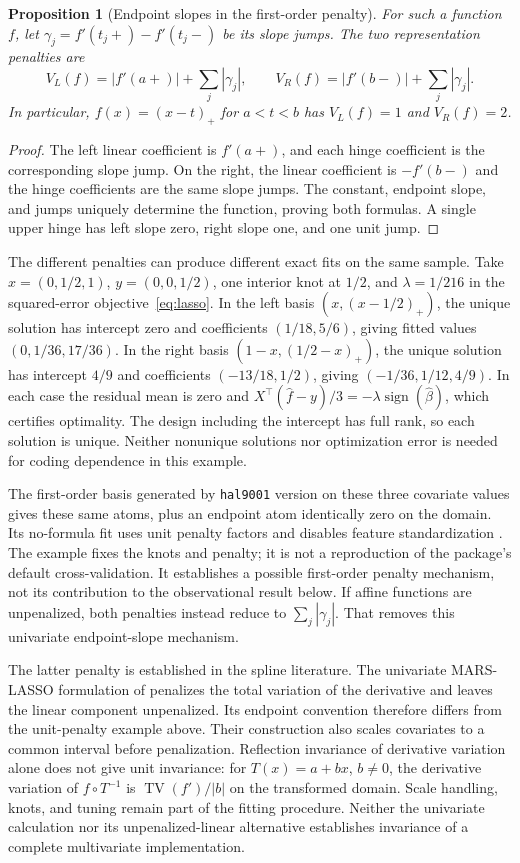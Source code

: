 \documentclass[11pt]{article}
\newtheorem{proposition}{Proposition}
\theoremstyle{definition}
\theoremstyle{remark}
\begin{document}
\begin{proposition}[Endpoint slopes in the first-order penalty]
\label{prop:firstorder-penalty}
For such a function $f$, let
$\gamma_j=f'(t_j+)-f'(t_j-)$ be its slope jumps. The two representation
penalties are
\[
 V_L(f)=|f'(a+)|+\sum_j|\gamma_j|,\qquad
 V_R(f)=|f'(b-)|+\sum_j|\gamma_j|.
\]
In particular, $f(x)=(x-t)_+$ for $a<t<b$ has $V_L(f)=1$ and $V_R(f)=2$.
\end{proposition}
\begin{proof}
The left linear coefficient is $f'(a+)$, and each hinge coefficient is
the corresponding slope jump. On the right, the linear coefficient is
$-f'(b-)$ and the hinge coefficients are the same slope jumps. The constant,
endpoint slope, and jumps uniquely determine the function, proving both
formulas. A single upper hinge has left slope zero, right slope one, and
one unit jump.
\end{proof}

The different penalties can produce different exact fits on the same sample.
Take $x=(0,1/2,1)$, $y=(0,0,1/2)$, one interior knot at $1/2$, and
$\lambda=1/216$ in the squared-error objective~\eqref{eq:lasso}. In the
left basis $(x,(x-1/2)_+)$, the unique solution has intercept zero and
coefficients $(1/18,5/6)$, giving fitted values
$(0,1/36,17/36)$. In the right basis $(1-x,(1/2-x)_+)$, the unique
solution has intercept $4/9$ and coefficients $(-13/18,1/2)$, giving
$(-1/36,1/12,4/9)$. In each case the residual mean is zero and
$X^\top(\hat f-y)/3=-\lambda\operatorname{sign}(\hat\beta)$, which
certifies optimality. The design including the intercept has full rank,
so each solution is unique. Neither nonunique solutions nor optimization
error is needed for coding dependence in this example.

The first-order basis generated by \texttt{hal9001} version \HalVersion{}
on these three covariate values gives these same atoms, plus an endpoint
atom identically zero on the domain. Its no-formula fit uses unit penalty
factors and disables feature standardization \citep{hal9001fit}. The example
fixes the knots and penalty; it is not a reproduction of the package's
default cross-validation. It establishes a possible first-order penalty
mechanism, not its contribution to the observational result below. If
affine functions are unpenalized, both penalties instead reduce to
$\sum_j|\gamma_j|$. That removes this univariate endpoint-slope mechanism.

The latter penalty is established in the spline literature. The univariate
MARS-LASSO formulation of \citet[Section~4.1]{ki2024} penalizes the total
variation of the derivative and leaves the linear component unpenalized.
Its endpoint convention therefore differs from the unit-penalty example
above. Their construction also scales covariates to a common interval
before penalization. Reflection invariance of derivative variation alone
does not give unit invariance: for $T(x)=a+bx$, $b\ne0$, the derivative
variation of $f\circ T^{-1}$ is $\operatorname{TV}(f')/|b|$ on the
transformed domain. Scale handling, knots, and tuning remain part of the
fitting procedure. Neither the univariate calculation nor its
unpenalized-linear alternative establishes invariance of a complete
multivariate implementation.
\end{document}
